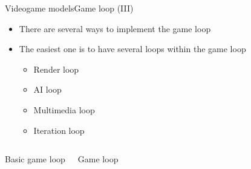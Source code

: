 \documentclass[10pt,compress]{beamer} %
\begin{document}
\begin{frame}{Videogame models}{Game loop (III)}
	\begin{itemize}
	   	\item There are several ways to implement the game loop
	   	\item The easiest one is to have several loops within the game loop
		\begin{itemize}
			\item Render loop
			\item AI loop
			\item Multimedia loop
			\item Iteration loop
		\end{itemize}
	\end{itemize}

    \begin{columns}
    \begin{block}{Basic game loop}
	    \vspace{-0.2cm}
	    
		\vspace{-0.2cm}
	\end{block}
    \begin{block}{Game loop}
	    \vspace{-0.2cm}
	    
		\vspace{-0.2cm}
	\end{block}
	\end{columns}
\end{frame}
\end{document}
